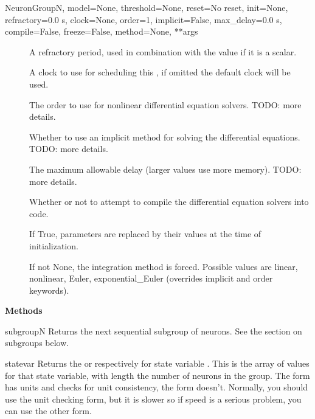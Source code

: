 \documentclass[letterpaper,10pt]{manual}
\begin{document}
\begin{classdesc}{NeuronGroup}{N, model=None, threshold=None, reset=No reset, init=None, refractory=0.0 s, clock=None, order=1, implicit=False, max\_delay=0.0 s, compile=False, freeze=False, method=None, **args}
\begin{description}
\item[]
A refractory period, used in combination with the  value
if it is a scalar.

\item[]
A clock to use for scheduling this \hyperlink{brian.NeuronGroup}{}, if omitted the
default clock will be used.

\item[]
The order to use for nonlinear differential equation solvers.
TODO: more details.

\item[]
Whether to use an implicit method for solving the differential
equations. TODO: more details.

\item[]
The maximum allowable delay (larger values use more memory).
TODO: more details.

\item[]
Whether or not to attempt to compile the differential equation
solvers into  code.

\item[]
If True, parameters are replaced by their values at the time
of initialization.

\item[]
If not None, the integration method is forced. Possible values are
linear, nonlinear, Euler, exponential\_Euler (overrides implicit and order
keywords).

\end{description}

\textbf{Methods}


\hypertarget{brian.NeuronGroup.subgroup}{}\begin{methoddesc}{subgroup}{N}
Returns the next sequential subgroup of  neurons. See
the section on subgroups below.
\end{methoddesc}


\hypertarget{brian.NeuronGroup.state}{}\begin{methoddesc}{state}{var}
\hypertarget{brian.NeuronGroup.state_}{}
Returns the  or  respectively for state
variable . This is the array of values for that
state variable, with length the number of neurons in the
group. The  form has units and checks for unit
consistency, the  form doesn't. Normally, you
should use the unit checking form, but it is slower
so if speed is a serious problem, you can use the other
form.
\end{methoddesc}


\end{classdesc}
\end{document}
